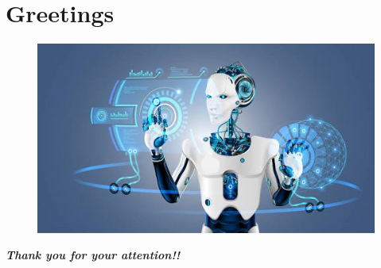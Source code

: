 \documentclass[9pt]{beamer}
\begin{document}
\section*{Greetings}
\begin{frame}
\begin{figure}[ht]
\includegraphics[scale=0.25]{images/thankyou.jpeg}
\end{figure}
  \centering \Huge
  \emph{\textbf{Thank you for your attention!!}}
\end{frame}
\end{document}
